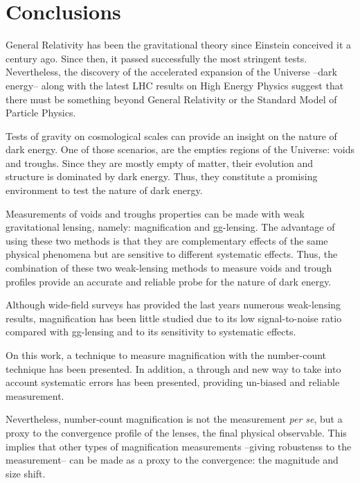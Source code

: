 \chapter{Conclusions}
\label{ch:conclusions}
General Relativity has been the gravitational theory since Einstein conceived it a century ago. Since then, it passed successfully the most stringent tests. Nevertheless, the discovery of the accelerated expansion of the Universe --dark energy-- along with the latest LHC results on High Energy Physics suggest that there must be something beyond General Relativity or the Standard Model of Particle Physics.
\newline

Tests of gravity on cosmological scales can provide an insight on the nature of dark energy. One of those scenarios, are the empties regions of the Universe: voids and troughs. Since they are mostly empty of matter, their evolution and structure is dominated by dark energy. Thus, they constitute a promising environment to test the nature of dark energy.
\newline

Measurements of voids and troughs properties can be made with weak gravitational lensing, namely: magnification and gg-lensing. The advantage of using these two methods is that they are complementary effects of the same physical phenomena but are sensitive to different systematic effects. Thus, the combination of these two weak-lensing methods to measure voids and trough profiles provide an accurate and reliable probe for the nature of dark energy.
\newline

Although wide-field surveys has provided the last years numerous weak-lensing results, magnification has been little studied due to its low signal-to-noise ratio compared with gg-lensing and to its sensitivity to systematic effects.
\newline

On this work, a technique to measure magnification with the number-count technique has been presented. In addition, a through and new way to take into account systematic errors has been presented, providing un-biased and reliable measurement.
\newline

Nevertheless, number-count magnification is not the measurement {\it per se}, but a proxy to the convergence profile of the lenses, the final physical observable. This implies that other types of magnification measurements --giving robustenss to the measurement-- can be made as a proxy to the convergence: the magnitude and size shift.
\newline

